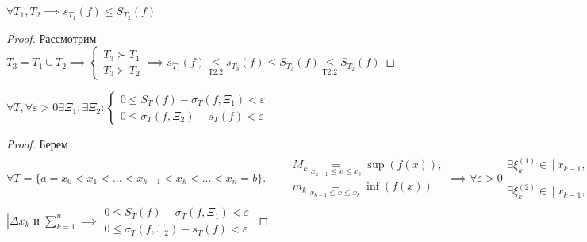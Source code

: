 \documentclass[../main.tex]{subfiles}
\begin{document}
\begin{theorem}
    $\forall T_{1},T_{2}\implies s_{T_{1}}(f)\leqslant S_{T_{2}}(f)$
\end{theorem}
\begin{proof}
    Рассмотрим $T_{3}=T_{1} \cup T_{2} \implies \begin{cases}
        T_{3}\succ T_{1} \\
        T_{3}\succ T_{2}
    \end{cases}\implies s_{T_{1}}(f)\underset{\text{Т2.2}}{\leqslant} s_{T_{3}}(f)\leqslant S_{T_{3}}(f)\underset{\text{Т2.2}}{\leqslant} S_{T_{2}}(f)$
\end{proof}
\begin{theorem}
    $ \forall T, \forall \varepsilon>0 \exists \Xi_{1},\exists \Xi_{2}:\begin{cases}
        0\leqslant S_{T}(f)-\sigma_{T}(f,\Xi_{1})<\varepsilon \\ 
        0\leqslant \sigma_{T}(f,\Xi_{2})-s_{T}(f)<\varepsilon
    \end{cases}$
\end{theorem}
\begin{proof}
    Берем $ \forall T =\{a=x_{0}<x_{1}<\dots<x_{k-1}<x_{k}<\dots<x_{n}=b\}. \qquad \begin{aligned}M_{k}\underset{x_{k-1}\leqslant x\leqslant x_{k}}{=}\sup{(f(x))},\\m_{k}\underset{x_{k-1}\leqslant x\leqslant x_{k}}{=}\inf{(f(x))} \end{aligned}
    \implies \forall \varepsilon > 0 \begin{aligned}\exists \xi_{k}^{(1)}\in [x_{k-1},x_{k}]: 0\leqslant M_{k}-f(\xi_{k}^{(1)})<\frac{\varepsilon}{b-a}\\ 
    \exists \xi_{k}^{(2)}\in [x_{k-1},x_{k}]:0\leqslant f(\xi_{k}^{(2)})-m_{k}<\frac{\varepsilon}{b-a}\end{aligned}$
    $\left| \Delta x_{k} \text{ и } \sum_{k=1}^{n} \right.\implies \begin{aligned}
        0\leqslant S_{T}(f)-\sigma_{T}(f,\Xi_{1})<\varepsilon\\
        0\leqslant \sigma_{T}(f,\Xi_{2})-s_{T}(f)<\varepsilon
    \end{aligned}$
\end{proof}
\end{document}
